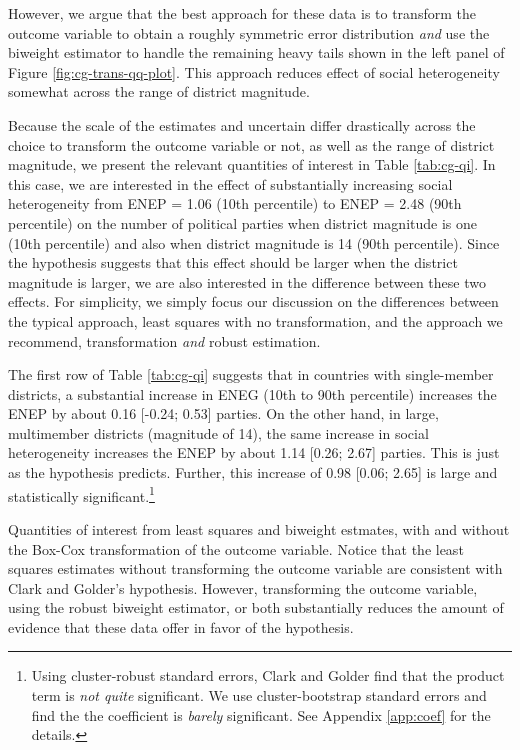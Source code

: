 \documentclass[12pt]{article}
\begin{document}
However, we argue that the best approach for these data is to transform the outcome variable to obtain a roughly symmetric error distribution \textit{and} use the biweight estimator to handle the remaining heavy tails shown in the left panel of Figure \ref{fig:cg-trans-qq-plot}. 
This approach reduces effect of social heterogeneity somewhat across the range of district magnitude.

Because the scale of the estimates and uncertain differ drastically across the choice to transform the outcome variable or not, as well as the range of district magnitude, we present the relevant quantities of interest in Table \ref{tab:cg-qi}. 
In this case, we are interested in the effect of substantially increasing social heterogeneity from ENEP = 1.06 (10th percentile) to ENEP = 2.48 (90th percentile) on the number of political parties when district magnitude is one (10th percentile) and also when district magnitude is 14 (90th percentile). 
Since the hypothesis suggests that this effect should be larger when the district magnitude is larger, we are also interested in the difference between these two effects. 
For simplicity, we simply focus our discussion on the differences between the typical approach, least squares with no transformation, and the approach we recommend, transformation \textit{and} robust estimation.

The first row of Table \ref{tab:cg-qi} suggests that in countries with single-member districts, a substantial increase in ENEG (10th to 90th percentile) increases the ENEP by about 0.16 [-0.24; 0.53] parties. 
On the other hand, in large, multimember districts (magnitude of 14), the same increase in social heterogeneity increases the ENEP by about 1.14 [0.26; 2.67] parties. 
This is just as the hypothesis predicts. 
Further, this increase of 0.98 [0.06; 2.65] is large and statistically significant.\footnote{Using cluster-robust standard errors, Clark and Golder find that the product term is \textit{not quite} significant. We use cluster-bootstrap standard errors and find the the coefficient is \textit{barely} significant. See Appendix \ref{app:coef} for the details.}

\begin{table}[h!]
{\scriptsize

}
\caption{Quantities of interest from least squares and biweight estmates, with and without the Box-Cox transformation of the outcome variable. 
Notice that the least squares estimates without transforming the outcome variable are consistent with Clark and Golder's hypothesis. 
However, transforming the outcome variable, using the robust biweight estimator,  or both substantially reduces the amount of evidence that these data offer in favor of the hypothesis.}\label{tab:cg-qi}
\end{table}
\end{document}
